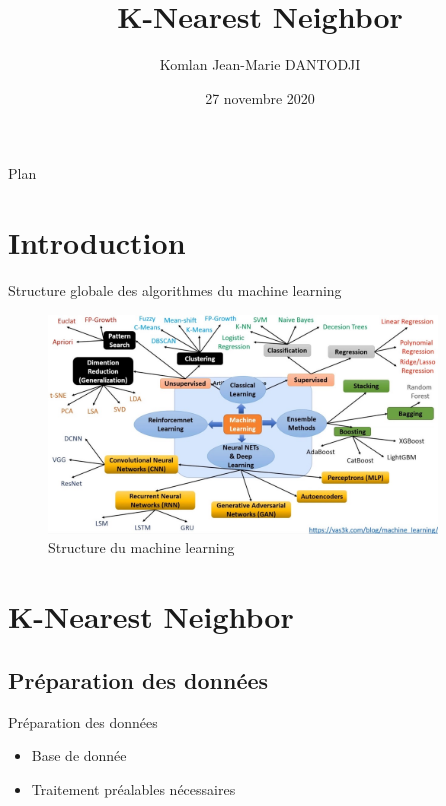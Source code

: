 \documentclass{beamer}
\title[KNN] 
{K-Nearest Neighbor}
\author[Komlan Dantodji] 
{Komlan Jean-Marie DANTODJI}
\institute[]
{
  Etudiant en M1 Big Data
  \and
  Université Paris 8}
\date{27 novembre 2020}
\begin{document}
\begin{frame}
  \titlepage
\end{frame}

\begin{frame}{Plan}
  \tableofcontents
\end{frame}
\section{Introduction}
\begin{frame}{Structure globale des algorithmes du machine learning }
	\begin{figure}[H]
    \includegraphics[width=\linewidth,height=5.8cm]{images/AI_fieds.jpg}
    \caption{Structure du machine learning}
    \label{fig:L1}
\end{figure}
\end{frame}

\section{K-Nearest Neighbor}
\subsection{Préparation des données}
\begin{frame}{Préparation des données}
\begin{itemize}
		\item Base de donnée
		\item Traitement préalables nécessaires
\end{itemize}
\end{frame}
\end{document}
